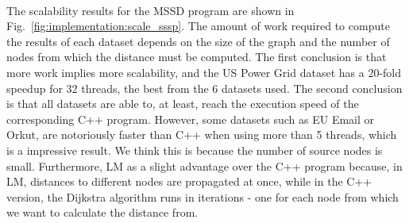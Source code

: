 \begin{figure}[]
\begin{subfigure}[b]{\plotsize\textwidth}
                \label{fig:implementation:scale_minmax_big}
        \end{subfigure}\\


        \label{fig:implementation:scale_minmax}
\end{figure}

The scalability results for the MSSD program are shown in
Fig.~\ref{fig:implementation:scale_sssp}. The amount of work required to compute
the results of each dataset depends on the size of the graph and the number of
nodes from which the distance must be computed. The first conclusion is that
more work implies more scalability, and the US Power Grid dataset has a 20-fold
speedup for 32 threads, the best from the 6 datasets used. The second conclusion
is that all datasets are able to, at least, reach the execution speed of the
corresponding C++ program. However, some datasets such as EU Email or Orkut, are
notoriously faster than C++ when using more than 5 threads, which is a
impressive result.  We think this is because the number of source nodes is
small. Furthermore, LM as a slight advantage over the C++ program because, in
LM, distances to different nodes are propagated at once, while in the C++
version, the Dijkstra algorithm runs in iterations - one for each node from
which we want to calculate the distance from.


